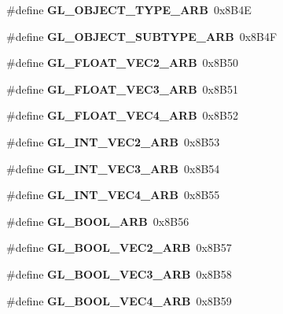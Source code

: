 \begin{DoxyCompactItemize}
\item 
\#define {\bfseries G\+L\+\_\+\+O\+B\+J\+E\+C\+T\+\_\+\+T\+Y\+P\+E\+\_\+\+A\+R\+B}~0x8\+B4\+E\label{_s_d_l__opengl_8h_a7e8aadcd710711b53333987f661d0a3d}

\item 
\#define {\bfseries G\+L\+\_\+\+O\+B\+J\+E\+C\+T\+\_\+\+S\+U\+B\+T\+Y\+P\+E\+\_\+\+A\+R\+B}~0x8\+B4\+F\label{_s_d_l__opengl_8h_acb1eadeab998cc67a92b8364cff24ea2}

\item 
\#define {\bfseries G\+L\+\_\+\+F\+L\+O\+A\+T\+\_\+\+V\+E\+C2\+\_\+\+A\+R\+B}~0x8\+B50\label{_s_d_l__opengl_8h_a5a915785c9c1384397508f85023c1a8d}

\item 
\#define {\bfseries G\+L\+\_\+\+F\+L\+O\+A\+T\+\_\+\+V\+E\+C3\+\_\+\+A\+R\+B}~0x8\+B51\label{_s_d_l__opengl_8h_ae006c284df5b4e1c8690407157c255d5}

\item 
\#define {\bfseries G\+L\+\_\+\+F\+L\+O\+A\+T\+\_\+\+V\+E\+C4\+\_\+\+A\+R\+B}~0x8\+B52\label{_s_d_l__opengl_8h_a4b4710222c39469d8c19acd2b7227e3c}

\item 
\#define {\bfseries G\+L\+\_\+\+I\+N\+T\+\_\+\+V\+E\+C2\+\_\+\+A\+R\+B}~0x8\+B53\label{_s_d_l__opengl_8h_ab1461d6824f7963ac496446ab3483804}

\item 
\#define {\bfseries G\+L\+\_\+\+I\+N\+T\+\_\+\+V\+E\+C3\+\_\+\+A\+R\+B}~0x8\+B54\label{_s_d_l__opengl_8h_aba0b5b54e90ac26b72c6efa66b9377ad}

\item 
\#define {\bfseries G\+L\+\_\+\+I\+N\+T\+\_\+\+V\+E\+C4\+\_\+\+A\+R\+B}~0x8\+B55\label{_s_d_l__opengl_8h_a2b5ce762a7a459d77e2f0c786f8f1be0}

\item 
\#define {\bfseries G\+L\+\_\+\+B\+O\+O\+L\+\_\+\+A\+R\+B}~0x8\+B56\label{_s_d_l__opengl_8h_af0a7952d4e24a09bd9f46efc7154fb5c}

\item 
\#define {\bfseries G\+L\+\_\+\+B\+O\+O\+L\+\_\+\+V\+E\+C2\+\_\+\+A\+R\+B}~0x8\+B57\label{_s_d_l__opengl_8h_a8a9feb95e641ca51e933c27f55a1ced0}

\item 
\#define {\bfseries G\+L\+\_\+\+B\+O\+O\+L\+\_\+\+V\+E\+C3\+\_\+\+A\+R\+B}~0x8\+B58\label{_s_d_l__opengl_8h_aa6376db3e82e02d4b226c40c68535386}

\item 
\#define {\bfseries G\+L\+\_\+\+B\+O\+O\+L\+\_\+\+V\+E\+C4\+\_\+\+A\+R\+B}~0x8\+B59\label{_s_d_l__opengl_8h_ae85aeb57ebdf4ba4fa37ea0ea054e773}


\end{DoxyCompactItemize}
